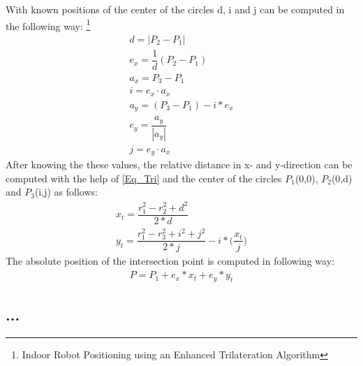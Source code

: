 With known positions of the center of the circles d, i and j can be computed in the following way: \footnote{Indoor Robot Positioning using an Enhanced Trilateration Algorithm}
\begin{align}
d = |P_2 - P_1| \\
e_x = \dfrac{1}{d}(P_2 - P_1) \\
a_x = P_3 - P_1 \\
i = e_x \cdot a_x \\
a_y = (P_3 - P_1) - i * e_x \\
e_y = \dfrac{a_y}{|a_y|} \\
j = e_y \cdot a_x
\end{align} 
After knowing the these values, the relative distance in x- and y-direction can be computed with the help of \ref{Eq_Tri} and the center of the circles $P_1$(0,0), $P_2$(0,d) and $P_3$(i,j) as follows:
\begin{align}
x_t = \dfrac{r_1^2 - r_2^2 + d^2}{2*d} \\
y_t = \dfrac{r_1^2 - r_3^2 + i^2 + j^2}{2*j} - i* \bigg(\dfrac{x_t}{j}\bigg) 
\end{align}
The absolute position of the intersection point is computed in following way:
\begin{align}
P = P_1 + e_x * x_t + e_y * y_t 
\end{align}

\subsection{...}